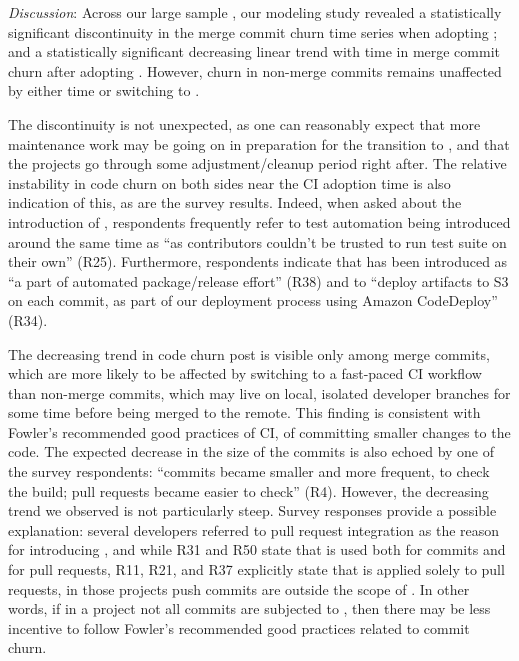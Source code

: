 

\smallskip\noindent \emph{Discussion}:
Across our large sample ,
our modeling study revealed a statistically significant discontinuity
in the merge commit churn time series when adopting \Tvis; and a statistically 
significant decreasing linear trend with time in merge commit churn after adopting \Tvis.
However, churn in non-merge commits remains unaffected by either time or 
switching to \Tvis.

The discontinuity is not unexpected, as one can reasonably expect that more 
maintenance work may be going on in preparation for the transition to \Tvis, 
and that the projects go through some adjustment/cleanup period right after.
The relative instability in code churn on both sides near the CI adoption time is 
also indication of this, as are the survey results.  
Indeed, when asked about the introduction of \Tvis, respondents frequently refer 
to test automation being introduced around the same time as \Tvi ``as contributors 
couldn't be trusted to run test suite on their own'' (R25). Furthermore, respondents 
indicate that \Tvi has been introduced as ``a part of automated package/release 
effort'' (R38) and to ``deploy artifacts to S3 on each commit, as part of our 
deployment process using Amazon CodeDeploy'' (R34).

The decreasing trend in code churn post \Tvi is visible only among merge commits,
which are more likely to be affected by switching to a fast-paced CI workflow than
non-merge commits, which may live on local, isolated developer branches for
some time before being merged to the remote.
This finding is consistent with Fowler's recommended good practices of CI, of 
committing smaller changes to the code.
The expected decrease in the size of the commits is also echoed by one of the 
survey respondents: ``commits became smaller and more frequent, to check 
the build; pull requests became easier to check'' (R4).
However, the decreasing trend we observed is not particularly steep.
Survey responses provide a possible explanation: several developers 
referred to pull request integration as the reason for introducing \Tvis, and 
while R31 and R50 state that \Tvis is used both for commits and for pull 
requests, R11, R21, and R37 explicitly state that \Tvis is applied solely to 
pull requests, \ie in those projects push commits are outside the scope of \Tvis.
In other words, if in a project not all commits are subjected to \Tvis, then 
there may be less incentive to follow Fowler's recommended good practices 
related to commit churn.

